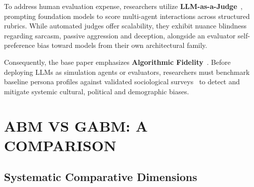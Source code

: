\documentclass[12pt,a4paper]{report}
\begin{document}
To address human evaluation expense, researchers utilize \textbf{LLM-as-a-Judge}~\cite{zheng2023judging}, prompting foundation models to score multi-agent interactions across structured rubrics. While automated judges offer scalability, they exhibit nuance blindness regarding sarcasm, passive aggression and deception, alongside an evaluator self-preference bias toward models from their own architectural family.

Consequently, the base paper emphasizes \textbf{Algorithmic Fidelity}~\cite{argyle2023out}. Before deploying LLMs as simulation agents or evaluators, researchers must benchmark baseline persona profiles against validated sociological surveys~\cite{serapio2023personality} to detect and mitigate systemic cultural, political and demographic biases.

\chapter{ABM VS GABM: A COMPARISON}
\label{chap:abm_vs_gabm}

\section{Systematic Comparative Dimensions}
\label{sec:comp_dimensions}
\end{document}
